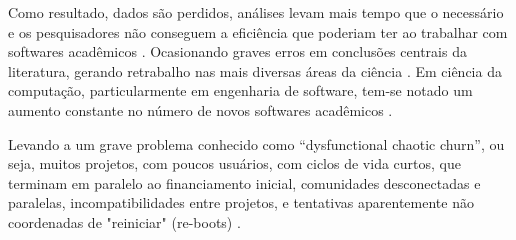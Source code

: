 Como resultado, dados são perdidos, análises levam mais tempo que o necessário
e os pesquisadores não conseguem a eficiência que poderiam ter ao trabalhar com
softwares acadêmicos \cite{wilson2017good}.  Ocasionando graves erros em
conclusões centrais da literatura, gerando retrabalho nas mais diversas áreas
da ciência \cite{Merali2010Computational}.  Em ciência da computação,
particularmente em engenharia de software, tem-se notado um aumento constante
no número de novos softwares acadêmicos \cite{allen2017engineering}.

%
%

%

Levando a um grave problema conhecido como ``dysfunctional chaotic churn'', ou
seja, muitos projetos, com poucos usuários, com ciclos de vida curtos, que terminam em
paralelo ao financiamento inicial, comunidades desconectadas e paralelas,
incompatibilidades entre projetos, e tentativas aparentemente não coordenadas
de "reiniciar" (re-boots) \cite{howison2015understanding}.


